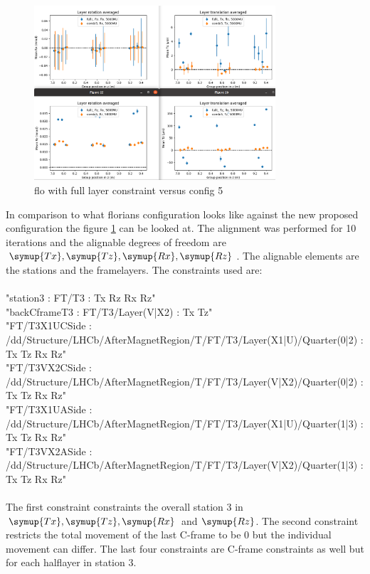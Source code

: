 \begin{figure}
  \centering
  \includegraphics[width=0.8\textwidth]{plots/august_13/combi5_layers_averaged.png}
  \caption{flo with full layer constraint versus config 5}
  \label{fig:floFullL_c5}
\end{figure}

In comparison to what florians configuration looks like against the new
proposed configuration the figure \ref{fig:floFullL_c5} can be looked at.
The alignment was performed for 10 iterations and the alignable degrees of
freedom are $\symup{Tx}, \symup{Tz}, \symup{Rx}, \symup{Rz}$. The alignable
elements are the stations and the framelayers.
The constraints used are: \\
\\
"station3 : FT/T3 : Tx Rz Rx Rz" \\
"backCframeT3 : FT/T3/Layer(V|X2) : Tx Tz" \\
"FT/T3X1UCSide : /dd/Structure/LHCb/AfterMagnetRegion/T/FT/T3/Layer(X1|U)/Quarter(0|2) : Tx Tz Rx Rz" \\
"FT/T3VX2CSide : /dd/Structure/LHCb/AfterMagnetRegion/T/FT/T3/Layer(V|X2)/Quarter(0|2) : Tx Tz Rx Rz" \\
"FT/T3X1UASide : /dd/Structure/LHCb/AfterMagnetRegion/T/FT/T3/Layer(X1|U)/Quarter(1|3) : Tx Tz Rx Rz" \\
"FT/T3VX2ASide : /dd/Structure/LHCb/AfterMagnetRegion/T/FT/T3/Layer(V|X2)/Quarter(1|3) : Tx Tz Rx Rz" \\
\\
The first constraint constraints the overall station 3 in $\symup{Tx}, \symup{Tz},
\symup{Rx}$ and $\symup{Rz}$. The second constraint restricts the total movement
of the last C-frame to be 0 but the individual movement can differ.
The last four constraints are C-frame constraints as well but for each halflayer in station 3.

